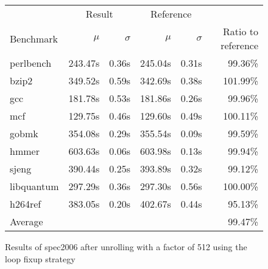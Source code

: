 \begin{figure}[h]
    \begin{center}
        \begin{tabular}{lrrrrr}
            \toprule
            & \multicolumn{2}{c}{Result} & \multicolumn{2}{c}{Reference}\\
            Benchmark & $\mu$ & $\sigma$ & $\mu$ & $\sigma$ & Ratio to reference\\
            \midrule
            perlbench & 243.47s & 0.36s & 245.04s & 0.31s & 99.36\%\\
            bzip2 & 349.52s & 0.59s & 342.69s & 0.38s & 101.99\%\\
            gcc & 181.78s & 0.53s & 181.86s & 0.26s & 99.96\%\\
            mcf & 129.75s & 0.46s & 129.60s & 0.49s & 100.11\%\\
            gobmk & 354.08s & 0.29s & 355.54s & 0.09s & 99.59\%\\
            hmmer & 603.63s & 0.06s & 603.98s & 0.13s & 99.94\%\\
            sjeng & 390.44s & 0.25s & 393.89s & 0.32s & 99.12\%\\
            libquantum & 297.29s & 0.36s & 297.30s & 0.56s & 100.00\%\\
            h264ref & 383.05s & 0.20s & 402.67s & 0.44s & 95.13\%\\
            \midrule
            Average & & & & & 99.47\%\\
            \bottomrule
        \end{tabular}
    \end{center}
    \caption{Results of spec2006 after unrolling with a factor of 512 using the loop fixup strategy}
    \label{fig:eval:perf:loop:512}
\end{figure}
